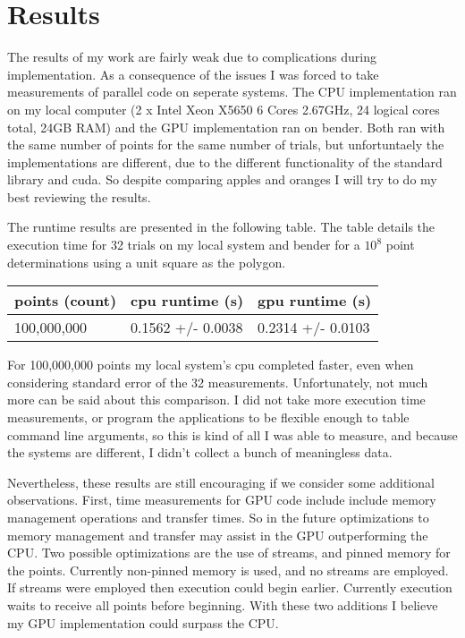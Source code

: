 \documentclass{article}
\begin{document}
\section{Results}
The results of my work are fairly weak due to complications during implementation. As a consequence of the issues I was forced to take measurements of parallel code on seperate systems. The CPU implementation ran on my local computer (2 x Intel Xeon X5650 6 Cores 2.67GHz, 24 logical cores total, 24GB RAM) and the GPU implementation ran on bender. Both ran with the same number of points for the same number of trials, but unfortuntaely the implementations are different, due to the different functionality of the standard library and cuda. So despite comparing apples and oranges I will try to do my best reviewing the results. 

The runtime results are presented in the following table. The table details the execution time for 32 trials on my local system and bender for a $10^8$ point determinations using a unit square as the polygon.

\begin{table}[h]
\begin{center}
\begin{tabular}{l|l|l}
points (count) & cpu runtime (s) & gpu runtime (s) \\ \hline
100,000,000 & 0.1562 +/- 0.0038 & 0.2314 +/- 0.0103 
\end{tabular}
\end{center}
\end{table}

For 100,000,000 points my local system's cpu completed faster, even when considering standard error of the 32 measurements. Unfortunately, not much more can be said about this comparison. I did not take more execution time measurements, or program the applications to be flexible enough to table command line arguments, so this is kind of all I was able to measure, and because the systems are different, I didn't collect a bunch of meaningless data. 

Nevertheless, these results are still encouraging if we consider some additional observations. First, time measurements for GPU code include include memory management operations and transfer times. So in the future optimizations to memory management and transfer may assist in the GPU outperforming the CPU. Two possible optimizations are the use of streams, and pinned memory for the points. Currently non-pinned memory is used, and no streams are employed. If streams were employed then execution could begin earlier. Currently execution waits to receive all points before beginning. With these two additions I believe my GPU implementation could surpass the CPU.
\end{document}
